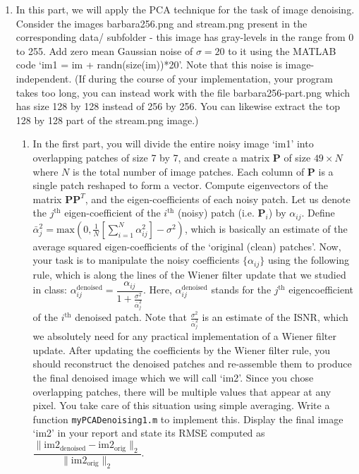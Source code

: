 \documentclass[11pt]{article}
\begin{document}
\begin{enumerate}
\item In this part, we will apply the PCA technique for the task of image denoising. Consider the images barbara256.png and stream.png present in the corresponding data/ subfolder - this image has gray-levels in the range from 0 to 255. Add zero mean Gaussian noise of $\sigma = 20$ to it using the MATLAB code `im1 = im + randn(size(im))*20'. Note that this noise is image-independent. (If during the course of your implementation, your program takes too long, you can instead work with the file barbara256-part.png which has size 128 by 128 instead of 256 by 256. You can likewise extract the top 128 by 128 part of the stream.png image.)
\begin{enumerate}
\item In the first part, you will divide the entire noisy image `im1' into overlapping patches of size 7 by 7, and create a matrix $\mathbf{P}$ of size $49 \times N$ where $N$ is the total number of image patches. Each column of $\mathbf{P}$ is a single patch reshaped to form a vector. Compute eigenvectors of the matrix $\mathbf{PP}^T$, and the eigen-coefficients of each noisy patch. 
Let us denote the $j^{\textrm{th}}$ eigen-coefficient of the $i^{\textrm{th}}$ (noisy) patch (i.e. $\mathbf{P}_i$) by $\alpha_{ij}$. Define $\bar{\alpha}^2_j = \textrm{max}(0,\frac{1}{N}[\sum_{i=1}^N \alpha^2_{ij}] - \sigma^2)$, which is basically an estimate of the average squared eigen-coefficients of the `original (clean) patches'. Now, your task is to manipulate the noisy coefficients $\{\alpha_{ij}\}$ using the following rule, which is along the lines of the Wiener filter update that we studied in class:
$\alpha^{\textrm{denoised}}_{ij} = \dfrac{\alpha_{ij}}{1 + \frac{\sigma^2}{\bar{\alpha}^2_j}}$.
Here, $\alpha^{\textrm{denoised}}_{ij}$ stands for the $j^{\textrm{th}}$ eigencoefficient of the $i^{\textrm{th}}$ denoised patch. Note that $\frac{\sigma^2}{\bar{\alpha}^2_j}$ is an estimate of the ISNR, which we absolutely need for any practical implementation of a Wiener filter update.  After updating the coefficients by the Wiener filter rule, you should reconstruct the denoised patches and re-assemble them to produce the final denoised image which we will call `im2'. Since you chose overlapping patches, there will be multiple values that appear at any pixel. You take care of this situation using simple averaging. Write a function \texttt{myPCADenoising1.m} to implement this. Display the final image `im2' in your report and state its RMSE computed as $\dfrac{\|\textrm{im2}_\textrm{denoised}-\textrm{im2}_\textrm{orig}\|_2}{\|\textrm{im2}_\textrm{orig}\|_2}$. 

\end{enumerate}
\end{enumerate}
\end{document}
